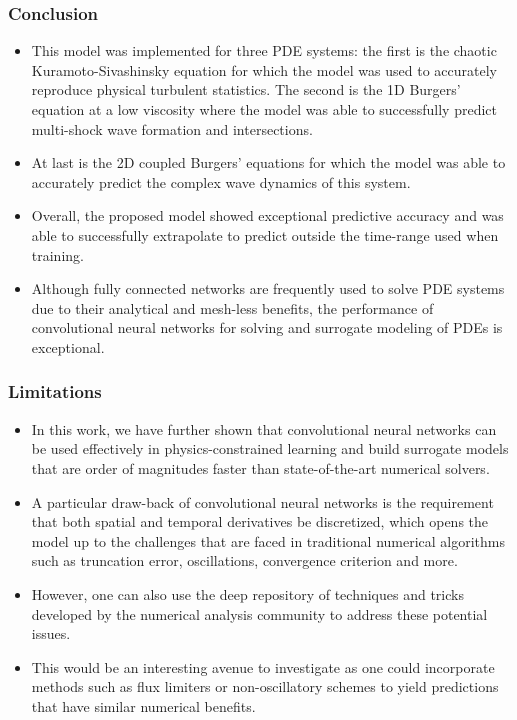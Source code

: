 \documentclass{beamer}
\theoremstyle{remark}
\begin{document}
\begin{frame}
\frametitle{Conclusion}

\begin{itemize}
\item{This model was implemented for three PDE systems: the first is the chaotic Kuramoto-Sivashinsky equation for which the model was used to accurately reproduce physical turbulent statistics.
The second is the 1D Burgers' equation at a low viscosity where the model was able to successfully predict multi-shock wave formation and intersections.}

\item{At last is the 2D coupled Burgers' equations for which the model was able to accurately predict the complex wave dynamics of this system.}

\item{Overall, the proposed model showed exceptional predictive accuracy and was able to successfully extrapolate to predict outside the time-range used when training.}

\item{Although fully connected networks are frequently used to solve PDE systems due to their analytical and mesh-less benefits, the performance of convolutional neural networks for solving and surrogate modeling of PDEs is exceptional.}
\end{itemize}
\end{frame}


\begin{frame}
\frametitle{Limitations}

\begin{itemize}

\item{In this work, we have further shown that convolutional neural networks can be used effectively in physics-constrained learning and build surrogate models that are order of magnitudes faster than state-of-the-art numerical solvers.}

\item{A particular draw-back of convolutional neural networks is the requirement that both spatial and temporal derivatives be discretized, which opens the model up to the challenges that are faced in traditional numerical algorithms such as truncation error, oscillations, convergence criterion and more.}

\item{However, one can also use the deep repository of techniques and tricks developed by the numerical analysis community to address these potential issues.}

\item{This would be an interesting avenue to investigate as one could incorporate methods such as flux limiters or non-oscillatory schemes to yield predictions that have similar numerical benefits.}

\end{itemize}
\end{frame}
\end{document}
